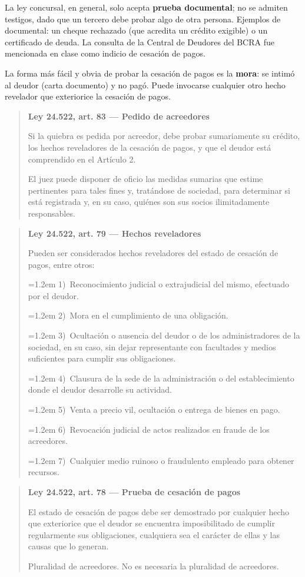 \documentclass[12pt,oneside]{book}
\newenvironment{articulo}[1]
  {\begin{quote}\small\textbf{#1}\par\smallskip}
  {\end{quote}}
\newcommand{\inciso}[2]{\par\noindent\hangindent=1.2em\hangafter=1 #1)~#2}
\begin{document}
La ley concursal, en general, solo acepta \textbf{prueba documental}; no se admiten testigos, dado que un tercero debe probar algo de otra persona. Ejemplos de documental: un cheque rechazado (que acredita un crédito exigible) o un certificado de deuda. La consulta de la Central de Deudores del BCRA fue mencionada en clase como indicio de cesación de pagos.

La forma más fácil y obvia de probar la cesación de pagos es la \textbf{mora}: se intimó al deudor (carta documento) y no pagó. Puede invocarse cualquier otro hecho revelador que exteriorice la cesación de pagos.

\begin{articulo}{Ley 24.522, art. 83 --- Pedido de acreedores}
Si la quiebra es pedida por acreedor, debe probar sumariamente su crédito, los hechos reveladores de la cesación de pagos, y que el deudor está comprendido en el Artículo 2.

El juez puede disponer de oficio las medidas sumarias que estime pertinentes para tales fines y, tratándose de sociedad, para determinar si está registrada y, en su caso, quiénes son sus socios ilimitadamente responsables.
\end{articulo}

\begin{articulo}{Ley 24.522, art. 79 --- Hechos reveladores}
Pueden ser considerados hechos reveladores del estado de cesación de pagos, entre otros:
\inciso{1}{Reconocimiento judicial o extrajudicial del mismo, efectuado por el deudor.}
\inciso{2}{Mora en el cumplimiento de una obligación.}
\inciso{3}{Ocultación o ausencia del deudor o de los administradores de la sociedad, en su caso, sin dejar representante con facultades y medios suficientes para cumplir sus obligaciones.}
\inciso{4}{Clausura de la sede de la administración o del establecimiento donde el deudor desarrolle su actividad.}
\inciso{5}{Venta a precio vil, ocultación o entrega de bienes en pago.}
\inciso{6}{Revocación judicial de actos realizados en fraude de los acreedores.}
\inciso{7}{Cualquier medio ruinoso o fraudulento empleado para obtener recursos.}
\end{articulo}

\begin{articulo}{Ley 24.522, art. 78 --- Prueba de cesación de pagos}
El estado de cesación de pagos debe ser demostrado por cualquier hecho que exteriorice que el deudor se encuentra imposibilitado de cumplir regularmente sus obligaciones, cualquiera sea el carácter de ellas y las causas que lo generan.

Pluralidad de acreedores. No es necesaria la pluralidad de acreedores.
\end{articulo}
\end{document}
